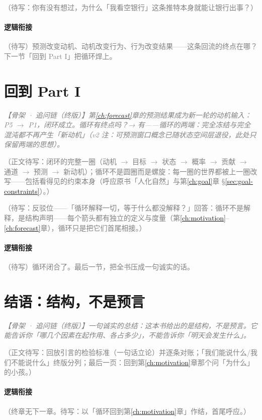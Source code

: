 \documentclass[../../main2.tex]{subfiles}
\begin{document}
	\begin{readingnote}
		\textcolor{gray}{（待写：你有没有想过，为什么「我看空银行」这条推特本身就能让银行出事？）}
	\end{readingnote}

	\paragraph*{逻辑衔接}
	\textcolor{gray}{（待写）预测改变动机、动机改变行为、行为改变结果——这条回流的终点在哪？下一节「回到 Part I」把循环焊上。}

	\section{回到 Part I}
	\label{sec:cl-return}

	\textcolor{gray}{\textit{【骨架 · 追问链（终版）】第\ref{ch:forecast}章的预测结果成为新一轮的动机输入：P5 $\to$ P1，闭环成立。循环有终点吗？→ 有——循环的两端：完全冻结与完全混沌都不再产生「新动机」（v2 注：可预测窗口概念已随状态空间层退役，此处只保留两端的思想）。}}

	\textcolor{gray}{（正文待写：闭环的完整一圈（动机 $\to$ 目标 $\to$ 状态 $\to$ 概率 $\to$ 贡献 $\to$ 通道 $\to$ 预测 $\to$ 新动机）；循环不是圆圈而是螺旋：每一圈的世界都被上一圈改写——包括看得见的约束本身（呼应原书「人化自然」与第\ref{ch:goal}章 §\ref{sec:goal-constraints}）。）}

	\begin{questionbox}
		\textcolor{gray}{（待写：反驳位——「循环解释一切，等于什么都没解释？」回答：循环不是解释，是结构声明——每个箭头都有独立的定义与度量（第\ref{ch:motivation}--\ref{ch:forecast}章），循环只是把它们首尾相接。）}
	\end{questionbox}

	\paragraph*{逻辑衔接}
	\textcolor{gray}{（待写）循环闭合了。最后一节，把全书压成一句诚实的话。}

	\section{结语：结构，不是预言}
	\label{sec:cl-coda}

	\textcolor{gray}{\textit{【骨架 · 追问链（终版）】一句诚实的总结：这本书给出的是结构，不是预言。它能告诉你「哪几个因素在起作用、各占多少」，不能告诉你「明天会发生什么」。}}

	\textcolor{gray}{（正文待写：回放引言的检验标准（一句话立论）并逐条对账；「我们能说什么/我们不能说什么」终版分列；最后一页：回到第\ref{ch:motivation}章那个问「为什么」的小孩。）}

	\paragraph*{逻辑衔接}
	\textcolor{gray}{（终章无下一章。待写：以「循环回到第\ref{ch:motivation}章」作结，首尾呼应。）}
\end{document}
